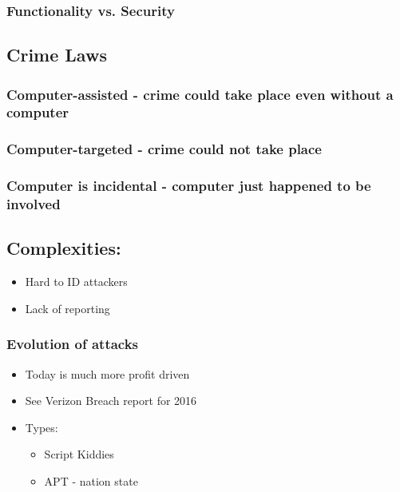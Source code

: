 \documentclass[11pt]{article}
\begin{document}
\subsubsection{Functionality vs. Security}
\label{sec:orgb1bc0a9}
\subsection{Crime Laws}
\label{sec:org0ee5781}
\subsubsection{Computer-assisted - crime could take place even without a computer}
\label{sec:org8d88751}
\subsubsection{Computer-targeted - crime could not take place}
\label{sec:org9b784ca}
\subsubsection{Computer is incidental - computer just happened to be involved}
\label{sec:orgb5f7fba}
\subsection{Complexities:}
\label{sec:org420413c}
\begin{itemize}
\item Hard to ID attackers
\item Lack of reporting
\end{itemize}
\subsubsection{Evolution of attacks}
\label{sec:org4fcadf2}
\begin{itemize}
\item Today is much more profit driven
\item See Verizon Breach report for 2016
\item Types:
\begin{itemize}
\item Script Kiddies
\item APT - nation state
\end{itemize}
\end{itemize}
\end{document}
